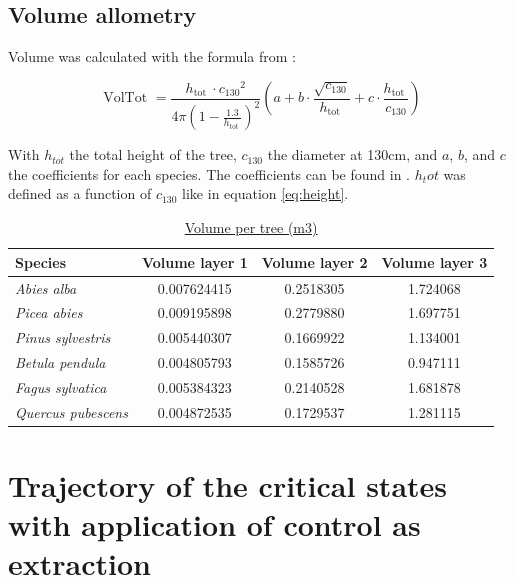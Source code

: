 \documentclass{article}
\begin{document}
\subsection{Volume allometry}

Volume was calculated with the formula from  \autocite{deleuzeEstimerVolumeTotal2014} :

\begin{equation}
    \text { VolTot }=\frac{h_{\text {tot }} \cdot c_{130}{ }^2}{4 \pi\left(1-\frac{1.3}{h_{\text {tot }}}\right)^2}\left(a+b \cdot \frac{\sqrt{c_{130}}}{h_{\text {tot }}}+c \cdot \frac{h_{\text {tot }}}{c_{130}}\right)
\end{equation}

With $h_{tot}$ the total height of the tree, $c_{130}$ the diameter at 130cm, and $a$, $b$, and $c$ the coefficients for each species. The coefficients can be found in  \autocite{deleuzeEstimerVolumeTotal2014}. $h_tot$ was defined as a function of $c_{130}$ like in equation \ref{eq:height}. 

\begin{table}[h]
    \centering
    \begin{tabular}{lccc}
    \hline
    \hline
    \textbf{Species} & \textbf{Volume layer 1} & \textbf{Volume layer 2} & \textbf{Volume layer 3} \\
    \hline
    \textit{Abies alba} & 0.007624415 & 0.2518305 & 1.724068 \\
    \textit{Picea abies} & 0.009195898 & 0.2779880 & 1.697751 \\
    \textit{Pinus sylvestris} & 0.005440307 & 0.1669922 & 1.134001 \\
    \textit{Betula pendula} & 0.004805793 & 0.1585726 & 0.947111 \\
    \textit{Fagus sylvatica} & 0.005384323 & 0.2140528 & 1.681878 \\
    \textit{Quercus pubescens} & 0.004872535 & 0.1729537 & 1.281115 \\
    \hline
    \hline
    \end{tabular}
    \caption{\underline{Volume per tree (m3)}} 
    \label{tab:volume}
\end{table}

\clearpage

\section{Trajectory of the critical states with application of control as extraction}
\end{document}

